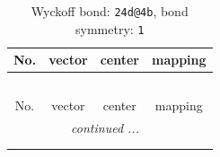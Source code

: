 \documentclass[fleqn,8pt]{jsarticle}
\begin{document}
\renewcommand{\arraystretch}{1.2}
\begin{longtable}{cccc}
\caption{Wyckoff bond: {\tt 24d@4b}, bond symmetry: {\tt 1}}
 \\
 \hline \hline
No. & vector & center & mapping \\ \hline \endfirsthead

\multicolumn{3}{l}{\tablename\ \thetable{}} \\
 \hline \hline
No. & vector & center & mapping \\ \hline \endhead

 \hline \hline
\multicolumn{3}{r}{\footnotesize\it continued ...} \\ \endfoot

 \hline \hline
\multicolumn{3}{r}{} \\ \endlastfoot


\end{longtable}
\end{document}

